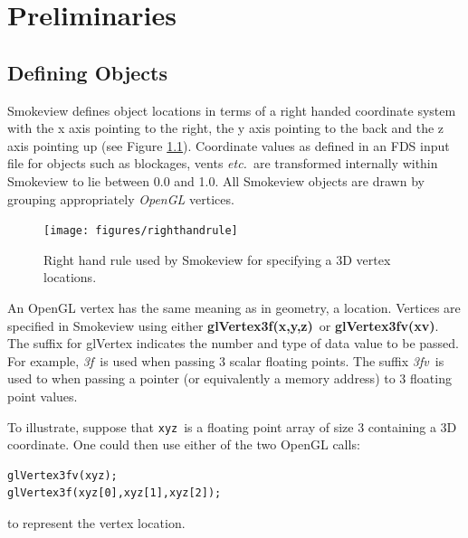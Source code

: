 \documentclass[11pt,twoside]{book}
\newcommand{\figoptions}{htp}
\begin{document}
%
%

\chapter{Preliminaries}
\label{visoverview}
\section{Defining Objects} Smokeview defines object locations in terms of a right handed coordinate system with the x axis pointing to the right, the y axis pointing to the back and the z axis pointing up (see Figure \ref{figrighthand}).  Coordinate values as defined in an FDS input file for objects such as blockages, vents {\em etc.}\ are transformed internally within Smokeview to lie between 0.0 and 1.0.
All Smokeview objects are drawn by grouping appropriately {\em OpenGL} vertices.
\begin{figure}[\figoptions]
\begin{center}
\texttt{[image: figures/righthandrule]}
\end{center}
\caption{Right hand rule used by Smokeview for specifying a 3D vertex locations.}
\label{figrighthand}
\end{figure}

An OpenGL vertex has the same meaning as in geometry, a location.
Vertices are specified in Smokeview using either {\bf glVertex3f(x,y,z)}\ or {\bf glVertex3fv(xv)}.  The suffix for glVertex indicates the number and type of data value to be passed.  For example, {\em 3f}\ is used when passing 3 scalar floating points.  The suffix {\em 3fv}\ is used to when passing a pointer (or equivalently a memory address) to 3 floating point  values.

To illustrate, suppose that {\tt xyz}\ is a floating point array of size 3 containing a 3D coordinate.  One could then use either of the two OpenGL calls:
\begin{verbatim}
glVertex3fv(xyz);
glVertex3f(xyz[0],xyz[1],xyz[2]);
\end{verbatim}
to represent the vertex location.
\end{document}
